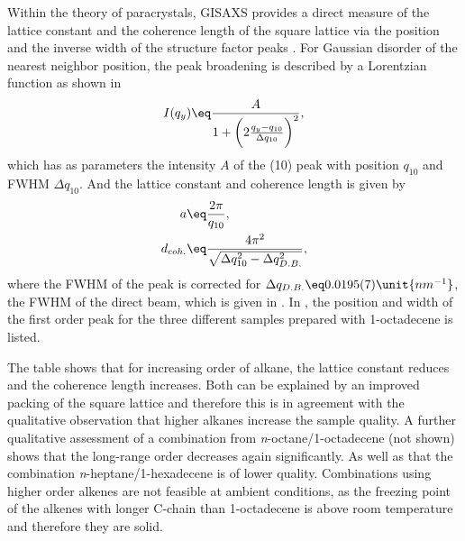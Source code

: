 \documentclass[\main/dresen_thesis.tex]{subfiles}
\begin{document}
    Within the theory of paracrystals, GISAXS provides a direct measure of the lattice constant and the coherence length of the square lattice via the position and the inverse width of the structure factor peaks \cite{Renaud_2009_Probi}.
    For Gaussian disorder of the nearest neighbor position, the peak broadening is described by a Lorentzian function as shown in 
    \begin{align}
      I(q_y) \eq \frac{A} {1 + \biggl(2\frac{q_y - q_{10}}{\Delta q_{10}}\biggr)^2},
    \end{align}
    which has as parameters the intensity $A$ of the (10) peak with position $q_{10}$ and FWHM $\Delta q_{10}$.
    And the lattice constant and coherence length is given by
    \begin{align}
      a &\eq \frac{2 \pi}{q_{10}}, \\
      d_{coh.} &\eq \frac{4 \pi^2}{\sqrt{ \Delta q_{10}^2 - \Delta q_{D.B.}^2 }},
    \end{align}
    where the FWHM of the peak is corrected for $\Delta q_{D.B.} \eq 0.0195(7) \unit{nm^{-1}}$, the FWHM of the direct beam, which is given in .
    In , the position and width of the first order peak for the three different samples prepared with 1-octadecene is listed.

    The table shows that for increasing order of alkane, the lattice constant reduces and the coherence length increases.
    Both can be explained by an improved packing of the square lattice and therefore this is in agreement with the qualitative observation that higher alkanes increase the sample quality.
    A further qualitative assessment of a combination from \textit{n}-octane/1-octadecene (not shown) shows that the long-range order decreases again significantly.
    As well as that the combination \textit{n}-heptane/1-hexadecene is of lower quality.
    Combinations using higher order alkenes are not feasible at ambient conditions, as the freezing point of the alkenes with longer C-chain than 1-octadecene is above room temperature and therefore they are solid.
\end{document}
